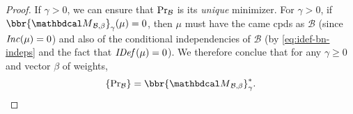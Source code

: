 \begin{proof}
If $\gamma > 0$, we can ensure that $\Pr_{\cal B}$ is its \emph{unique} minimizer. For $\gamma > 0$, if $\bbr{\PDGof{\mathcal B, \beta}}_\gamma(\mu) = 0$, then $\mu$ must have the came cpds as $\mathcal B$ (since $\mathit{Inc}(\mu) = 0$) and also of the conditional independencies of $\mathcal B$ (by \eqref{eq:idef-bn-indeps} and the fact that $\mathit{IDef}_{}(\mu) = 0$).
We therefore conclue that for any $\gamma\geq0$ and vector $\beta$ of weights, 
\[ \{ \Pr\nolimits_{\cal B} \} = \bbr{\PDGof{\mathcal B, \beta}}_\gamma^* .\]

	
\end{proof}

